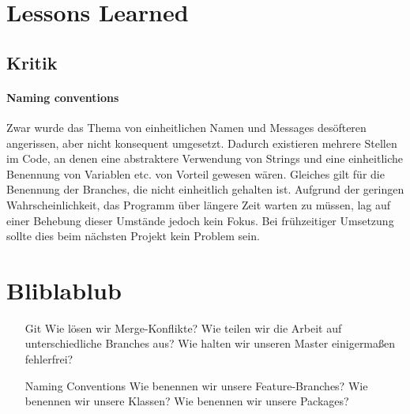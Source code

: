 \section{Lessons Learned}

\subsection{Kritik}

\paragraph{Naming conventions} Zwar wurde das Thema von einheitlichen Namen und Messages desöfteren angerissen, aber nicht konsequent umgesetzt. Dadurch existieren mehrere Stellen im Code, an denen eine abstraktere Verwendung von Strings und eine einheitliche Benennung von Variablen etc. von Vorteil gewesen wären. Gleiches gilt für die Benennung der Branches, die nicht einheitlich gehalten ist. Aufgrund der geringen Wahrscheinlichkeit, das Programm über längere Zeit warten zu müssen, lag auf einer Behebung dieser Umstände jedoch kein Fokus. Bei frühzeitiger Umsetzung sollte dies beim nächsten Projekt kein Problem sein.

\section{Bliblablub}

	\begin{itemize}
		\item[Git] Wie lösen wir Merge-Konflikte? Wie teilen wir die Arbeit auf unterschiedliche Branches aus? Wie halten wir unseren Master einigermaßen fehlerfrei?
		\item[Naming Conventions] Wie benennen wir unsere Feature-Branches? Wie benennen wir unsere Klassen? Wie benennen wir unsere Packages?
	\end{itemize}
